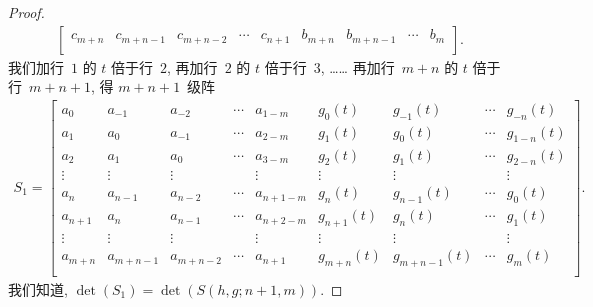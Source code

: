 \documentclass[../libro.tex]{subfiles}
\begin{document}
\begin{proof}
\begin{align*}
\begin{bmatrix}
            c_{m+n} & c_{m+n-1} & c_{m+n-2} & \cdots & c_{n+1}   & b_{m+n}   & b_{m+n-1}  & \cdots & b_{m}      \\
        \end{bmatrix}.
    \end{align*}
    我们加行~\(1\) 的 \(t\) 倍于行~\(2\),
    再加行~\(2\) 的 \(t\) 倍于行~\(3\),
    ……
    再加行~\(m+n\) 的 \(t\) 倍于行~\(m+n+1\),
    得 \(m+n+1\)~级阵
    \begin{align*}
        S_1 =
        \begin{bmatrix}
            a_{0}   & a_{-1}    & a_{-2}    & \cdots & a_{1-m}   & g_{0} (t)   & g_{-1} (t)    & \cdots & g_{-n} (t)  \\
            a_{1}   & a_{0}     & a_{-1}    & \cdots & a_{2-m}   & g_{1} (t)   & g_{0} (t)     & \cdots & g_{1-n} (t) \\
            a_{2}   & a_{1}     & a_{0}     & \cdots & a_{3-m}   & g_{2} (t)   & g_{1} (t)     & \cdots & g_{2-n} (t) \\
            \vdots  & \vdots    & \vdots    & {}     & \vdots    & \vdots      & \vdots        & {}     & \vdots      \\
            a_{n}   & a_{n-1}   & a_{n-2}   & \cdots & a_{n+1-m} & g_{n} (t)   & g_{n-1} (t)   & \cdots & g_{0} (t)   \\
            a_{n+1} & a_{n}     & a_{n-1}   & \cdots & a_{n+2-m} & g_{n+1} (t) & g_{n} (t)     & \cdots & g_{1} (t)   \\
            \vdots  & \vdots    & \vdots    & {}     & \vdots    & \vdots      & \vdots        & {}     & \vdots      \\
            a_{m+n} & a_{m+n-1} & a_{m+n-2} & \cdots & a_{n+1}   & g_{m+n} (t) & g_{m+n-1} (t) & \cdots & g_{m} (t)   \\
        \end{bmatrix}.
    \end{align*}
    我们知道, \(\det {(S_1)} = \det {(S(h, g; n+1, m))}\).


\end{proof}
\end{document}
